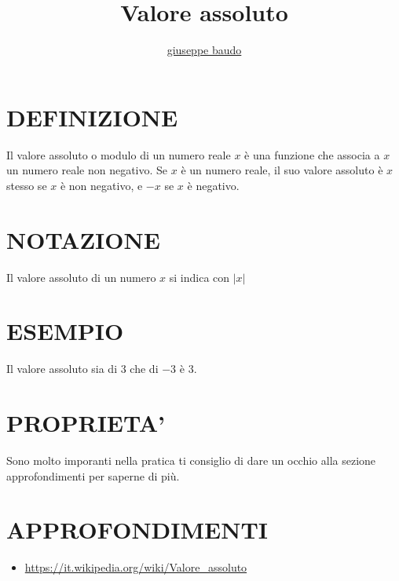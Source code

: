 \documentclass[a4paper,10pt]{article}
\title{Valore assoluto}
\author{\href{http://www.baudo.hol.es}{giuseppe baudo}}
\begin{document}
\maketitle

\section{DEFINIZIONE}
Il valore assoluto o modulo di un numero reale $x$ è una funzione che associa a $x$ un numero reale non negativo. Se $x$
è un numero reale, il suo valore assoluto è $x$ stesso se $x$ è non negativo, e $-x$ se $x$ è negativo.

\section{NOTAZIONE}
Il valore assoluto di un numero $x$ si indica con $|x|$

\section{ESEMPIO}
Il valore assoluto sia di $3$ che di $-3$ è $3$. 

\section{PROPRIETA'}
Sono molto imporanti nella pratica ti consiglio di dare un occhio alla sezione approfondimenti per saperne di più.

\section{APPROFONDIMENTI}
\begin{itemize}
 \item \url{https://it.wikipedia.org/wiki/Valore_assoluto}
\end{itemize}
\end{document}
